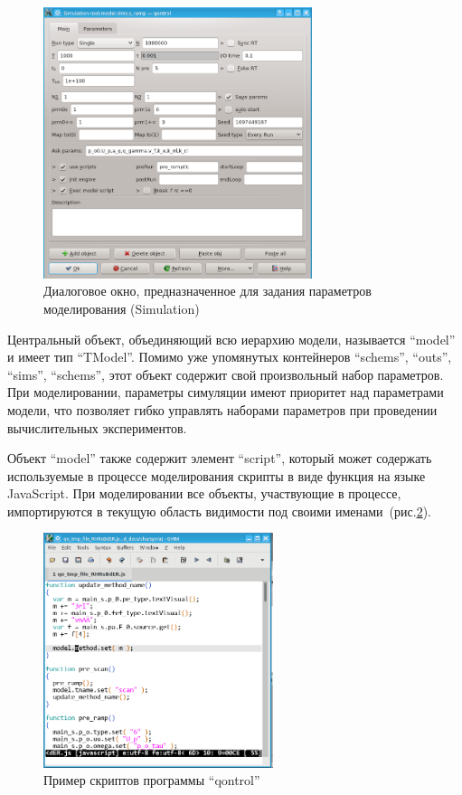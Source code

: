 \begin{figure}[htb!]
  \begin{center}
    \includegraphics[width=0.7\textwidth]{p/qontrol_task.png}
  \end{center}
  \caption{Диалоговое окно, предназначенное для задания параметров моделирования (Simulation)}
  \label{atu:f:qontrol_simul}
\end{figure}


Центральный объект, объединяющий всю иерархию модели,
называется ``model'' и имеет тип ``TModel''.
Помимо уже упомянутых контейнеров ``schems'', ``outs'', ``sims'', ``schems'',
этот объект содержит свой произвольный набор параметров.
При моделировании, параметры симуляции имеют приоритет
над параметрами модели, что позволяет гибко управлять
наборами параметров при проведении вычислительных экспериментов.

Объект ``model'' также содержит элемент ``script'',
который может содержать используемые в процессе моделирования
скрипты в виде функция на языке JavaScript.
При моделировании все объекты, участвующие
в процессе, импортируются в текущую область видимости
под своими именами~(рис.\ref{atu:f:qontrol_js}).


\begin{figure}[htb!]
  \begin{center}
    \includegraphics[width=0.6\textwidth]{p/qontrol_js.png}
  \end{center}
  \caption{Пример скриптов программы ``qontrol''}
  \label{atu:f:qontrol_js}
\end{figure}



